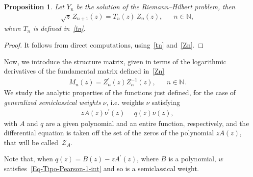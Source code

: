 \documentclass[12pt]{amsart}
\newtheorem{proposition}{Proposition}[section]
\begin{document}
 

\begin{proposition}\label{propnewZn}
Let \( Y_n \) be the solution of the Riemann--Hilbert problem, then
\begin{align*}
 \sqrt{z} \, Z_{n+1}(z) = T_n(z) \, Z_n(z), && n \in \mathbb N
 ,
\end{align*}
where \( T_n \) is defined in~\eqref{tn}.
\end{proposition}

\begin{proof} 
It follows from direct computations, using~\eqref{tn} and~\eqref{Zn}.
\end{proof}

Now, we introduce the structure matrix, given in terms of the logarithmic derivatives of the fundamental matrix defined in~\eqref{Zn}
\begin{align}\label{Mn}
 M_n(z)=Z_n^\prime(z)Z_n^{-1}(z), && n \in \mathbb N
 .
\end{align}
We study the analytic properties of the functions just defined, for the case of \emph{generalized semiclassical weights} \( \nu \), i.e. weights \( \nu \) satisfying
\begin{align}
\label{eq:pearson_nu}
z A(z) \nu^\prime(z) =
q(z) \nu(z) ,
\end{align}
with \( A\) and \( q \) are a given polynomial and an entire function, respectively,
and the differential equation is taken off the set of the zeros of the polynomial \( z A(z) \), that will be called~\( \mathcal{Z}_A \).

Note that, when \( q(z) = B (z) - z A^\prime (z) \), where \(B \) is a polynomial, \( w \) satisfies~\eqref{Eq-Tipo-Pearson-1-int} and so is a semiclassical weight.

\end{document}
